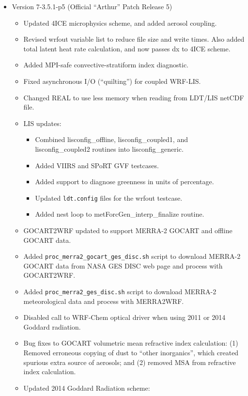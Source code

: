 \begin{itemize}
\item Version 7-3.5.1-p5 (Official ``Arthur'' Patch Release 5)
  \begin{itemize}
    \item Updated 4ICE microphysics scheme, and added aerosol coupling. 
    \item Revised wrfout variable list to reduce file size and write times. 
      Also added total latent heat rate calculation, and now passes dx to
      4ICE scheme.
    \item Added MPI-safe convective-stratiform index diagnostic.
    \item Fixed asynchronous I/O (``quilting'') for coupled WRF-LIS.
    \item Changed REAL to use less memory when reading from LDT/LIS netCDF 
      file.
    \item LIS updates:
      \begin{itemize}
      \item Combined lisconfig\_offline, lisconfig\_coupled1, and 
        lisconfig\_coupled2 routines into lisconfig\_generic.
      \item Added VIIRS and SPoRT GVF testcases.
      \item Added support to diagnose greenness in units of percentage.
      \item Updated \texttt{ldt.config} files for the wrfout testcase.
      \item Added nest loop to metForcGen\_interp\_finalize routine.
      \end{itemize}
    \item GOCART2WRF updated to support MERRA-2 GOCART and offline GOCART data.
    \item Added \texttt{proc\_merra2\_gocart\_ges\_disc.sh} script to download 
      MERRA-2 GOCART data from NASA GES DISC web page and process with 
      GOCART2WRF.
    \item Added \texttt{proc\_merra2\_ges\_disc.sh} script to download MERRA-2 
      meteorological data and process with MERRA2WRF.
    \item Disabled call to WRF-Chem optical driver when using 2011 or 2014
      Goddard radiation.
    \item Bug fixes to GOCART volumetric mean refractive index calculation: 
      (1) Removed erroneous copying of dust to ``other inorganics'', which 
      created spurious extra source of aerosols; and (2) removed MSA from
      refractive index calculation.
    \item Updated 2014 Goddard Radiation scheme:

\end{itemize}
\end{itemize}
